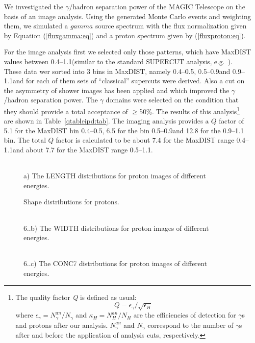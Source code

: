 We investigated the $\gamma$/hadron separation power
of the MAGIC Telescope
on the basis of an image analysis.
Using the generated Monte Carlo events and
weighting them, we simulated a $gamma$ source spectrum with the
flux normalization given by Equation (\ref{fluxgamma:eq}) and a proton
spectrum given by (\ref{fluxproton:eq}).

For the image analysis first we selected only those patterns, which
have MaxDIST values between 0.4\tdeg--1.1\tdeg (similar to the
standard SUPERCUT analysis, e.g.\ \cite{punch:91}).  These data 
wer sorted into 3 bins in MaxDIST, namely 0.4\tdeg--0.5\tdeg,
0.5\tdeg--0.9\tdeg and 0.9\tdeg--1.1\tdeg and for each of them
sets of ``classical'' supercuts were derived.
Also a cut on the asymmetry of shower images has been applied
and which improved the $\gamma$/hadron separation power.
The $\gamma$ domains were selected on the
condition that they should 
provide a total acceptance of $\geq$50\%. The results of this 
analysis\footnote{The quality factor {\it Q} is defined as usual:
\[
Q = \epsilon_\gamma / \sqrt{\epsilon_H}
\]
where $\epsilon_\gamma=N_\gamma^{an}/N_\gamma$ and
$\kappa_H=N_H^{an}/N_H$ are the efficiencies of detection for $\gamma$s and
protons after our analysis. $N_\gamma^{an}$ and
$N_\gamma$ correspond to the number of $\gamma$s
after and before the application of analysis cuts, respectively.} 
are shown in Table~\ref{qtableipd:tab}.
The imaging analysis
provides a $Q$ factor of 5.1 for the MaxDIST bin 0.4\tdeg--0.5\tdeg,
6.5 for the bin 0.5\tdeg--0.9\tdeg and 12.8 for the 0.9\tdeg--1.1\tdeg
bin. The total  $Q$ factor is calculated to be about 7.4 for the
MaxDIST range 0.4\tdeg--1.1\tdeg and about 7.7
for the
MaxDIST range 0.5\tdeg--1.1\tdeg.

\setcounter{figdummy}{\value{figure}}
\begin{figure}[h]
 \begin{center}
  \\
  {a) The LENGTH distributions for proton images of
   different energies.}
  \caption{Shape distributions for protons.}
  \label{pshape:fig}
 \end{center}
\end{figure}
\begin{figure}[h]
 \begin{center}
  \\
  {6.{\thefigdummy}.b) The WIDTH distributions for proton images of
   different energies.}
 \end{center}
\end{figure}
\begin{figure}[h]
 \begin{center}
  \\
  {6.{\thefigdummy}.c) The CONC7 distributions for proton images of
   different energies.}
 \end{center}
\end{figure}

